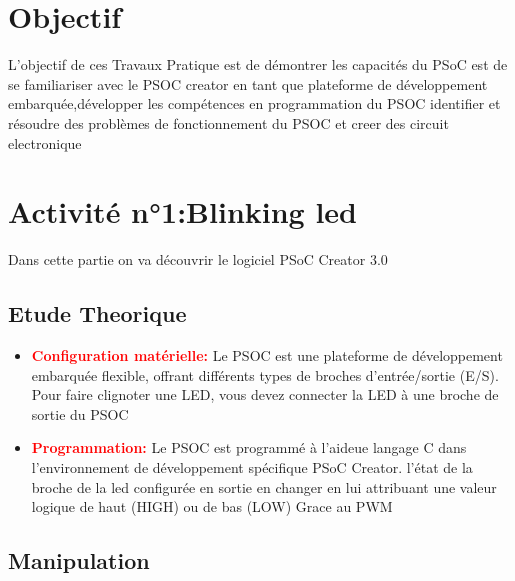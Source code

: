 \section{Objectif}
\label{chap:Objectif}

L'objectif de ces Travaux Pratique est de démontrer les capacités du PSoC est de se familiariser avec le
 PSOC creator en tant que plateforme de développement embarquée,développer les compétences en programmation du PSOC
identifier et résoudre des problèmes de fonctionnement du PSOC et creer des circuit electronique
\\

\section{Activité n°1:Blinking led}
\label{chap:Activité n°1:Blinking led}
Dans cette partie on va découvrir le logiciel PSoC Creator 3.0
\subsection{Etude Theorique}
\label{sec:Etude Theorique}
\begin{itemize}
    \item \textcolor{red}{\textbf{Configuration matérielle:}} Le PSOC est une plateforme de développement embarquée flexible, offrant différents types de broches d'entrée/sortie (E/S).
     Pour faire clignoter une LED, vous devez connecter la LED à une broche de sortie du PSOC 
    \item \textcolor{red}{\textbf{Programmation:}} Le PSOC est programmé à l'aideue langage C dans l'environnement de développement spécifique  PSoC Creator.
      l'état de la broche de la led  configurée en sortie en changer en  lui attribuant une valeur logique de haut (HIGH) ou de bas (LOW) Grace au PWM
\end{itemize}


\subsection{Manipulation}
\label{sec:Manipulation}


